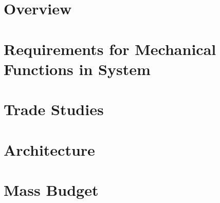 \documentclass[12pt, letterpaper]{article}
\begin{document}
\cfoot{\normalsize\thepage}
\onehalfspacing
\newpage

\newpage

\newpage
\singlespacing
\tableofcontents
\onehalfspacing
\newpage
\listoffigures
\listoftables

\clearpage
\cfoot{\normalsize\thepage}
\section{Overview}
\label{sect:intro}
\section{Requirements for Mechanical Functions in System}
\label{sect:requirements}
\section{Trade Studies}
\label{sect:tradeoff}
\section{Architecture}
\label{sect:architecture}
\section{Mass Budget}
\label{sect:mass}
\newpage



\newpage
\appendix
\end{document}
